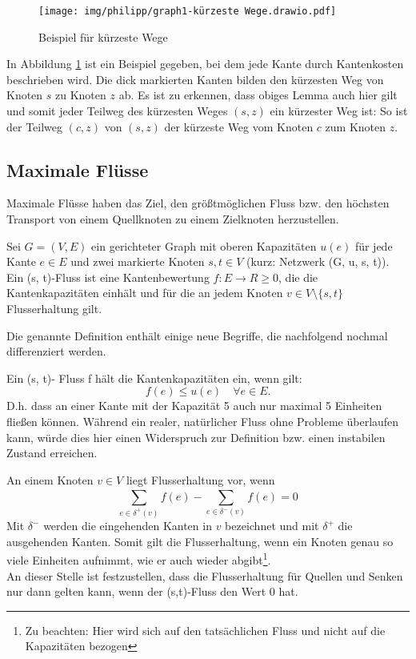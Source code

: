 \begin{figure}[ht]
\centering
\texttt{[image: img/philipp/graph1-kürzeste Wege.drawio.pdf]}
\caption{Beispiel für kürzeste Wege}
\label{fig:shortestpath}
\end{figure}
In Abbildung \ref{fig:shortestpath} ist ein Beispiel gegeben, bei dem jede Kante durch Kantenkosten beschrieben wird. Die dick markierten Kanten bilden den kürzesten Weg von Knoten $s$ zu Knoten $z$ ab. Es ist zu erkennen, dass obiges Lemma auch hier gilt und somit jeder Teilweg des kürzesten Weges $(s,z)$ ein kürzester Weg ist: So ist der Teilweg $(c,z)$ von $(s,z)$ der kürzeste Weg vom Knoten $c$ zum Knoten $z$.

\subsection{Maximale Flüsse}

Maximale Flüsse haben das Ziel, den größtmöglichen Fluss bzw. den höchsten Transport von einem Quellknoten zu einem Zielknoten herzustellen.

\begin{definition}
    Sei $G = (V,E)$ ein gerichteter Graph mit oberen Kapazitäten $u(e)$ für jede Kante $e \in E$ und zwei markierte Knoten $s, t \in V$ (kurz: Netzwerk (G, u, s, t)). Ein (s, t)-Fluss ist eine Kantenbewertung $f : E \to R \geq 0$, die die Kantenkapazitäten einhält und für die an jedem Knoten $v \in V \setminus \{s, t\}$ Flusserhaltung gilt. 
\end{definition}

Die genannte Definition enthält einige neue Begriffe, die nachfolgend nochmal differenziert werden.
    
Ein (s, t)- Fluss f hält die Kantenkapazitäten ein, wenn gilt:
\begin{equation}
    f(e) \leq u(e) \quad \forall e \in E.
\end{equation}
D.h. dass an einer Kante mit der Kapazität 5 auch nur maximal 5 Einheiten fließen können. Während ein realer, natürlicher Fluss ohne Probleme überlaufen kann, würde dies hier einen Widerspruch zur Definition bzw. einen instabilen Zustand erreichen.

An einem Knoten $v \in V$ liegt Flusserhaltung vor, wenn
\begin{equation}
    \displaystyle\sum_{e \in \delta ^{+} (v)}^{} f(e) - \displaystyle\sum_{e \in \delta ^{-} (v)}^{} f(e) = 0
    \label{formular:flusserhaltung}
\end{equation}
Mit $\delta ^{-}$ werden die eingehenden Kanten in $v$ bezeichnet und mit $\delta ^{+}$ die ausgehenden Kanten. Somit gilt die Flusserhaltung, wenn ein Knoten genau so viele Einheiten aufnimmt, wie er auch wieder abgibt\footnote{Zu beachten: Hier wird sich auf den tatsächlichen Fluss und nicht auf die Kapazitäten bezogen}.\\
An dieser Stelle ist festzustellen, dass die Flusserhaltung für Quellen und Senken nur dann gelten kann, wenn der (s,t)-Fluss den Wert 0 hat.

